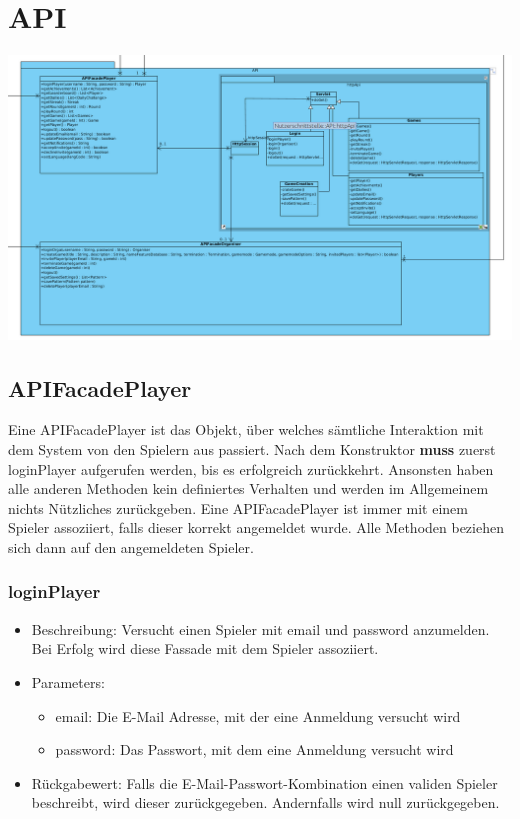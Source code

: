 \documentclass[a4paper]{scrreprt}
\begin{document}
	\section{API}
	\includegraphics[width=\textwidth]{img/api.png}
	\subsection{APIFacadePlayer}
	Eine APIFacadePlayer ist das Objekt, über welches sämtliche Interaktion mit dem System von den Spielern aus passiert. Nach dem Konstruktor \textbf{muss} zuerst loginPlayer aufgerufen werden, bis es erfolgreich zurückkehrt. Ansonsten haben alle anderen Methoden kein definiertes Verhalten und werden im Allgemeinem nichts Nützliches zurückgeben. Eine APIFacadePlayer ist immer mit einem Spieler assoziiert, falls dieser korrekt angemeldet wurde. Alle Methoden beziehen sich dann auf den angemeldeten Spieler.
	\subsubsection{loginPlayer}
	\begin{itemize}
		\item Beschreibung: Versucht einen Spieler mit email und password anzumelden. Bei Erfolg wird diese Fassade mit dem Spieler assoziiert.
		\item Parameters:
		\begin{itemize}
			\item email: Die E-Mail Adresse, mit der eine Anmeldung versucht wird
			\item password: Das Passwort, mit dem eine Anmeldung versucht wird
		\end{itemize}
		\item Rückgabewert: Falls die E-Mail-Passwort-Kombination einen validen Spieler beschreibt, wird dieser zurückgegeben. Andernfalls wird null zurückgegeben.
	\end{itemize}
\end{document}
